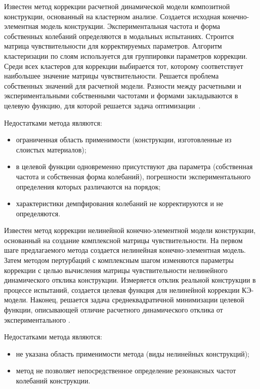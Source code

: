 Известен метод коррекции расчетной динамической модели композитной конструкции, основанный на кластерном анализе. Создается исходная конечно-элементная модель конструкции. Экспериментальная частота и форма собственных колебаний определяются в модальных испытаниях. Строится матрица чувствительности для корректируемых параметров. Алгоритм кластеризации по слоям используется для группировки параметров коррекции. Среди всех кластеров для коррекции выбирается тот, которому соответствует наибольшее значение матрицы чувствительности. Решается проблема собственных значений для расчетной модели. Разности между расчетными и экспериментальными собственными частотами и формами закладываются в целевую функцию, для которой решается задача оптимизации~\cite{lib:modelUpdating:CN107357992A}.

Недостатками метода являются: 
\begin{itemize}
	\item ограниченная область применимости (конструкции, изготовленные из слоистых материалов); 
	\item в целевой функции одновременно присутствуют два параметра (собственная частота и собственная форма колебаний), погрешности экспериментального определения которых различаются на порядок; 
	\item характеристики демпфирования колебаний не корректируются и не определяются. 
\end{itemize}

Известен метод коррекции нелинейной конечно-элементной модели конструкции, основанный на создание комплексной матрицы чувствительности. На первом шаге предлагаемого метода создается нелинейная конечно-элементная модель. Затем методом пертурбаций с комплексным шагом изменяются параметры коррекции с целью вычисления матрицы чувствительности нелинейного динамического отклика конструкции. Измеряется отклик реальной конструкции в процессе испытаний, создается целевая функция для нелинейной коррекции КЭ-модели. Наконец, решается задача среднеквадратичной минимизации целевой функции, описывающей отличие расчетного динамического отклика от экспериментального \cite{lib:modelUpdating:CN109885896A}. 

Недостатками метода являются: 
\begin{itemize}
	\item не указана область применимости метода (виды нелинейных конструкций); 
	\item метод не позволяет непосредственное определение резонансных частот колебаний конструкции. 
\end{itemize}

